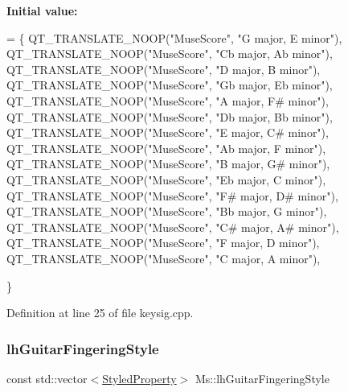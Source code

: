 {\bfseries Initial value\+:}
\begin{DoxyCode}
= \{
      QT\_TRANSLATE\_NOOP(\textcolor{stringliteral}{"MuseScore"}, \textcolor{stringliteral}{"G major, E minor"}),
      QT\_TRANSLATE\_NOOP(\textcolor{stringliteral}{"MuseScore"}, \textcolor{stringliteral}{"Cb major, Ab minor"}),
      QT\_TRANSLATE\_NOOP(\textcolor{stringliteral}{"MuseScore"}, \textcolor{stringliteral}{"D major, B minor"}),
      QT\_TRANSLATE\_NOOP(\textcolor{stringliteral}{"MuseScore"}, \textcolor{stringliteral}{"Gb major, Eb minor"}),
      QT\_TRANSLATE\_NOOP(\textcolor{stringliteral}{"MuseScore"}, \textcolor{stringliteral}{"A major, F# minor"}),
      QT\_TRANSLATE\_NOOP(\textcolor{stringliteral}{"MuseScore"}, \textcolor{stringliteral}{"Db major, Bb minor"}),
      QT\_TRANSLATE\_NOOP(\textcolor{stringliteral}{"MuseScore"}, \textcolor{stringliteral}{"E major, C# minor"}),
      QT\_TRANSLATE\_NOOP(\textcolor{stringliteral}{"MuseScore"}, \textcolor{stringliteral}{"Ab major, F minor"}),
      QT\_TRANSLATE\_NOOP(\textcolor{stringliteral}{"MuseScore"}, \textcolor{stringliteral}{"B major, G# minor"}),
      QT\_TRANSLATE\_NOOP(\textcolor{stringliteral}{"MuseScore"}, \textcolor{stringliteral}{"Eb major, C minor"}),
      QT\_TRANSLATE\_NOOP(\textcolor{stringliteral}{"MuseScore"}, \textcolor{stringliteral}{"F# major, D# minor"}),
      QT\_TRANSLATE\_NOOP(\textcolor{stringliteral}{"MuseScore"}, \textcolor{stringliteral}{"Bb major, G minor"}),
      QT\_TRANSLATE\_NOOP(\textcolor{stringliteral}{"MuseScore"}, \textcolor{stringliteral}{"C# major, A# minor"}),
      QT\_TRANSLATE\_NOOP(\textcolor{stringliteral}{"MuseScore"}, \textcolor{stringliteral}{"F major, D minor"}),
      QT\_TRANSLATE\_NOOP(\textcolor{stringliteral}{"MuseScore"}, \textcolor{stringliteral}{"C major, A minor"}),

      \}
\end{DoxyCode}


Definition at line 25 of file keysig.\+cpp.

\mbox{\label{namespace_ms_a4eba927f7c72706e3a3562bf429a7d98}} 
\subsubsection{\texorpdfstring{lh\+Guitar\+Fingering\+Style}{lhGuitarFingeringStyle}}
{\footnotesize\ttfamily const std\+::vector$<$\hyperlink{struct_ms_1_1_styled_property}{Styled\+Property}$>$ Ms\+::lh\+Guitar\+Fingering\+Style}

